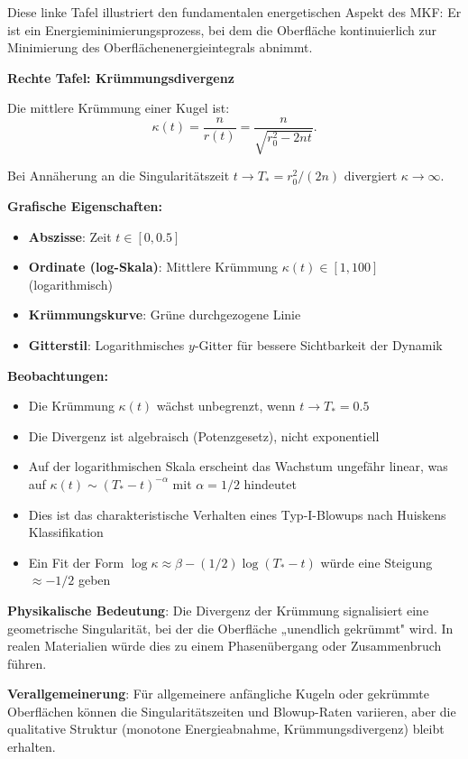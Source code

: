\documentclass[a4paper,12pt]{article}
\theoremstyle{definition}
\begin{document}
Diese linke Tafel illustriert den fundamentalen energetischen Aspekt des MKF: Er ist ein Energieminimierungsprozess, bei dem die Oberfläche kontinuierlich zur Minimierung des Oberflächenenergieintegrals abnimmt.

\textbf{Rechte Tafel: Krümmungsdivergenz}

Die mittlere Krümmung einer Kugel ist:
\[
\kappa(t) = \frac{n}{r(t)} = \frac{n}{\sqrt{r_0^2 - 2nt}}.
\]

Bei Annäherung an die Singularitätszeit $t \to T_* = r_0^2 / (2n)$ divergiert $\kappa \to \infty$.

\textbf{Grafische Eigenschaften:}
\begin{itemize}
	\item \textbf{Abszisse}: Zeit $t \in [0, 0.5]$
	\item \textbf{Ordinate (log-Skala)}: Mittlere Krümmung $\kappa(t) \in [1, 100]$ (logarithmisch)
	\item \textbf{Krümmungskurve}: Grüne durchgezogene Linie
	\item \textbf{Gitterstil}: Logarithmisches $y$-Gitter für bessere Sichtbarkeit der Dynamik
\end{itemize}

\textbf{Beobachtungen:}
\begin{itemize}
	\item Die Krümmung $\kappa(t)$ wächst unbegrenzt, wenn $t \to T_* = 0.5$
	\item Die Divergenz ist algebraisch (Potenzgesetz), nicht exponentiell
	\item Auf der logarithmischen Skala erscheint das Wachstum ungefähr linear, was auf $\kappa(t) \sim (T_* - t)^{-\alpha}$ mit $\alpha = 1/2$ hindeutet
	\item Dies ist das charakteristische Verhalten eines Typ-I-Blowups nach Huiskens Klassifikation
	\item Ein Fit der Form $\log \kappa \approx \beta - (1/2) \log(T_* - t)$ würde eine Steigung $\approx -1/2$ geben
\end{itemize}

\textbf{Physikalische Bedeutung}: Die Divergenz der Krümmung signalisiert eine geometrische Singularität, bei der die Oberfläche „unendlich gekrümmt" wird. In realen Materialien würde dies zu einem Phasenübergang oder Zusammenbruch führen.

\textbf{Verallgemeinerung}: Für allgemeinere anfängliche Kugeln oder gekrümmte Oberflächen können die Singularitätszeiten und Blowup-Raten variieren, aber die qualitative Struktur (monotone Energieabnahme, Krümmungsdivergenz) bleibt erhalten.
\end{document}
